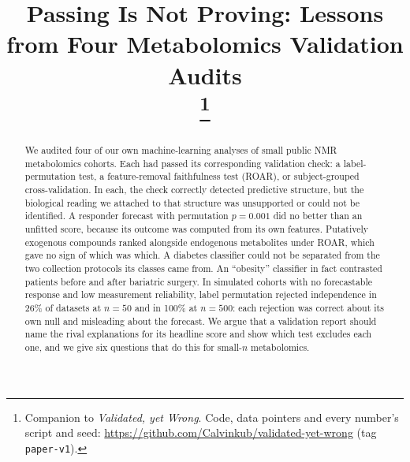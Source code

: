 \documentclass[conference]{IEEEtran}
\begin{document}
\title{Passing Is Not Proving: Lessons from Four Metabolomics Validation Audits\\
\thanks{Companion to \emph{Validated, yet Wrong}. Code, data pointers and every number's script and seed: \protect\url{https://github.com/Calvinkub/validated-yet-wrong} (tag \texttt{paper-v1}).}}

\author{
\and
{}
}

\maketitle

\begin{abstract}
We audited four of our own machine-learning analyses of small public NMR
metabolomics cohorts. Each had passed its corresponding validation check:
a label-permutation test, a feature-removal faithfulness test (ROAR), or
subject-grouped cross-validation. In each, the check correctly detected
predictive structure, but the biological reading we attached to that
structure was unsupported or could not be identified. A responder forecast
with permutation $p=0.001$ did no better than an unfitted score, because its
outcome was computed from its own features. Putatively exogenous compounds
ranked alongside endogenous metabolites under ROAR, which gave no sign of
which was which. A diabetes classifier
could not be separated from the two collection protocols its classes came
from. An ``obesity'' classifier in fact contrasted patients before and after
bariatric surgery. In simulated cohorts with no forecastable response and
low measurement reliability, label permutation rejected independence in
26\% of datasets at $n=50$ and in 100\% at $n=500$: each rejection was
correct about its own null and misleading about the forecast. We argue that
a validation report should name the rival explanations for its headline
score and show which test excludes each one, and we give six questions that
do this for small-$n$ metabolomics.
\end{abstract}
\end{document}
